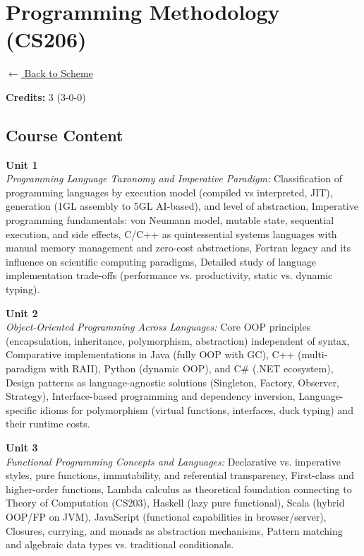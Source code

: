 \section*{Programming Methodology (CS206)}
\label{course:CS206}

\noindent \small{\hyperref[main:scheme]{$\leftarrow$ Back to Scheme}} \vspace{0.5cm}

\noindent \textbf{Credits:} 3 (3-0-0)

\subsection*{Course Content}
\noindent\textbf{Unit 1} \\
\textit{Programming Language Taxonomy and Imperative Paradigm:} Classification of programming languages by execution model (compiled vs interpreted, JIT), generation (1GL assembly to 5GL AI-based), and level of abstraction, Imperative programming fundamentals: von Neumann model, mutable state, sequential execution, and side effects, C/C++ as quintessential systems languages with manual memory management and zero-cost abstractions, Fortran legacy and its influence on scientific computing paradigms, Detailed study of language implementation trade-offs (performance vs. productivity, static vs. dynamic typing).

\vspace{0.3cm}

\noindent\textbf{Unit 2} \\
\textit{Object-Oriented Programming Across Languages:} Core OOP principles (encapsulation, inheritance, polymorphism, abstraction) independent of syntax, Comparative implementations in Java (fully OOP with GC), C++ (multi-paradigm with RAII), Python (dynamic OOP), and C\# (.NET ecosystem), Design patterns as language-agnostic solutions (Singleton, Factory, Observer, Strategy), Interface-based programming and dependency inversion, Language-specific idioms for polymorphism (virtual functions, interfaces, duck typing) and their runtime costs.

\vspace{0.3cm}

\noindent\textbf{Unit 3} \\
\textit{Functional Programming Concepts and Languages:} Declarative vs. imperative styles, pure functions, immutability, and referential transparency, First-class and higher-order functions, Lambda calculus as theoretical foundation connecting to Theory of Computation (CS203), Haskell (lazy pure functional), Scala (hybrid OOP/FP on JVM), JavaScript (functional capabilities in browser/server), Closures, currying, and monads as abstraction mechanisms, Pattern matching and algebraic data types vs. traditional conditionals.

